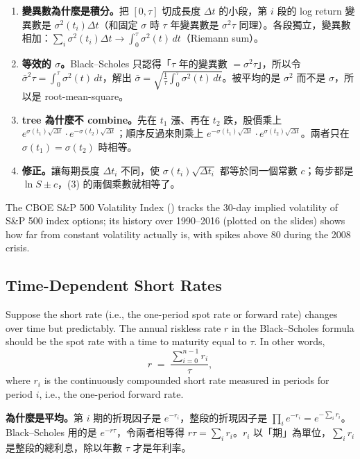 \begin{remark}
	\begin{enumerate}[(1),nosep]
		\item \textbf{變異數為什麼是積分。}把 $[0,\tau]$ 切成長度 $\Delta t$ 的小段，第 $i$ 段的 log return 變異數是 $\sigma^{2}(t_{i})\Delta t$（和固定 $\sigma$ 時 $\tau$ 年變異數是 $\sigma^{2}\tau$ 同理）。各段獨立，變異數相加：$\sum_{i}\sigma^{2}(t_{i})\Delta t\to\int_{0}^{\tau}\sigma^{2}(t)\,dt$（Riemann sum）。
		\item \textbf{等效的 $\sigma$。}Black--Scholes 只認得「$\tau$ 年的變異數 $=\sigma^{2}\tau$」，所以令 $\bar{\sigma}^{2}\tau=\int_{0}^{\tau}\sigma^{2}(t)\,dt$，解出 $\bar{\sigma}=\sqrt{\frac1\tau\int_{0}^{\tau}\sigma^{2}(t)\,dt}$。被平均的是 $\sigma^{2}$ 而不是 $\sigma$，所以是 root-mean-square。
		\item \textbf{tree 為什麼不 combine。}先在 $t_{1}$ 漲、再在 $t_{2}$ 跌，股價乘上 $e^{\sigma(t_{1})\sqrt{\Delta t}}\cdot e^{-\sigma(t_{2})\sqrt{\Delta t}}$；順序反過來則乘上 $e^{-\sigma(t_{1})\sqrt{\Delta t}}\cdot e^{\sigma(t_{2})\sqrt{\Delta t}}$。兩者只在 $\sigma(t_{1})=\sigma(t_{2})$ 時相等。
		\item \textbf{修正。}讓每期長度 $\Delta t_{i}$ 不同，使 $\sigma(t_{i})\sqrt{\Delta t_{i}}$ 都等於同一個常數 $c$；每步都是 $\ln S\pm c$，(3) 的兩個乘數就相等了。
	\end{enumerate}
\end{remark}
\suppend

The CBOE S\&P 500 Volatility Index () tracks the 30-day implied volatility of S\&P 500 index options; its history over 1990--2016 (plotted on the slides) shows how far from constant volatility actually is, with spikes above 80 during the 2008 crisis.

\subsection{Time-Dependent Short Rates}


Suppose the short rate (i.e., the one-period spot rate or forward rate) changes over time but predictably.
The annual riskless rate $r$ in the Black--Scholes formula should be the spot rate with a time to maturity equal to $\tau$.
In other words,
\[
	r \;=\; \frac{\sum_{i=0}^{n-1}r_{i}}{\tau} ,
\]
where $r_{i}$ is the continuously compounded short rate measured in periods for period $i$, i.e., the one-period forward rate.

\suppstart
\begin{remark}
	\textbf{為什麼是平均。}第 $i$ 期的折現因子是 $e^{-r_{i}}$，整段的折現因子是 $\prod_{i}e^{-r_{i}}=e^{-\sum_{i}r_{i}}$。Black--Scholes 用的是 $e^{-r\tau}$，令兩者相等得 $r\tau=\sum_{i}r_{i}$。$r_{i}$ 以「期」為單位，$\sum_{i}r_{i}$ 是整段的總利息，除以年數 $\tau$ 才是年利率。
\end{remark}

